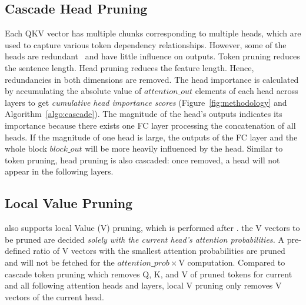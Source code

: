 \subsection{Cascade Head Pruning}
Each QKV vector has multiple chunks corresponding to multiple heads, which are used to capture various token dependency relationships. However, some of the heads are redundant~\cite{voita2019analyzing} and have little influence on outputs. 
Token pruning reduces the sentence length. Head pruning reduces the feature length. Hence, redundancies in both dimensions are removed.
The head importance is calculated by accumulating the absolute value of $attention\_out$ elements of each head across layers to get \emph{cumulative head importance scores} (Figure~\ref{fig:methodology} and Algorithm~\ref{algo:cascade}). The magnitude of the head's outputs indicates its importance because there exists one FC layer processing the concatenation of all heads. If the magnitude of one head is large, the outputs of the FC layer and the whole block $block\_out$ will be more heavily influenced by the head. Similar to token pruning, head pruning is also cascaded: once removed, a head will not appear in the following layers.


\subsection{Local Value Pruning}
\name also supports local Value (V) pruning, which is performed after \softmax. the V vectors to be pruned are decided \emph{solely with the current head's attention probabilities.} A pre-defined ratio of V vectors with the smallest attention probabilities are pruned and will not be fetched for the $attention\_prob \times$V computation.
Compared to cascade token pruning which removes Q, K, and V of pruned tokens for current and all following attention heads and layers, local V pruning only removes V vectors of the current head.

